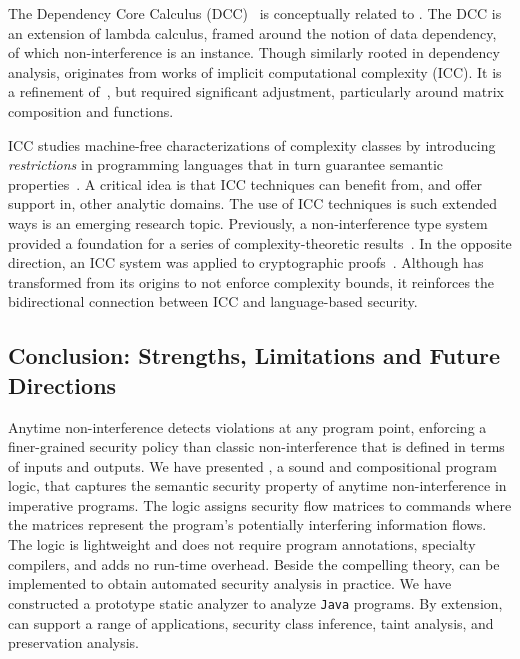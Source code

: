 The Dependency Core Calculus (DCC)~\cite{abadi1999b} is conceptually related to
\lname. The DCC is an extension of lambda calculus, framed around the notion of
data dependency, of which non-interference is an instance. Though similarly
rooted in dependency analysis, \lname originates from works of implicit
computational complexity (ICC). It is a refinement
of~\cite{moyen20172,aubert20232}, but \lname required significant adjustment,
particularly around matrix composition and functions.

ICC studies machine-free characterizations of complexity classes by introducing
\emph{restrictions} in programming languages that in turn guarantee semantic
properties~\cite{dallago2011}. A critical idea is that ICC techniques can
benefit from, and offer support in, other analytic domains. The use of ICC
techniques is such extended ways is an emerging research topic. Previously, a
non-interference type system provided a foundation for a series of
complexity-theoretic results~\cite{marion2011,hainry2023}. In the opposite
direction, an ICC system was applied to cryptographic proofs~\cite{baillot2019}.
Although \lname has transformed from its origins to not enforce complexity
bounds, it reinforces the bidirectional connection between ICC and
language-based security.

\subsection{Conclusion: Strengths, Limitations and Future Directions}
\label{sec:conclusion}

Anytime non-interference detects violations at any program point, enforcing a
finer-grained security policy than classic non-interference that is defined in
terms of inputs and outputs. We have presented \lname, a sound and compositional
program logic, that captures the semantic security property of anytime
non-interference in imperative programs. The logic assigns security flow
matrices to commands where the matrices represent the program's potentially
interfering information flows. The logic is lightweight and does not require
program annotations, specialty compilers, and adds no run-time overhead. Beside
the compelling theory, \lname can be implemented to obtain automated security
analysis in practice. We have constructed a prototype static analyzer \tool to
analyze \texttt{Java} programs. By extension, \tool can support a range of
applications, \eg security class inference, taint analysis, and preservation
analysis.

